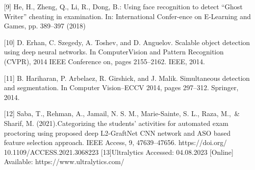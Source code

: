 \documentclass[conference]{IEEEtran}
\begin{document}
 [9]   He, H., Zheng, Q., Li, R., Dong, B.: Using face recognition to detect
    “Ghost Writer” cheating in examination. In: International Confer-ence on
    E-Learning and Games, pp. 389–397 (2018)

[10] D. Erhan, C. Szegedy, A. Toshev, and D. Anguelov. Scalable
     object detection using deep neural networks. In ComputerVision and Pattern Recognition (CVPR), 2014 IEEE Conference on, pages 2155–2162. IEEE, 2014.

[11] B. Hariharan, P. Arbelaez, R. Girshick, and J. Malik. Simultaneous               detection and segmentation. In Computer Vision–ECCV 2014, pages 297–312.         Springer, 2014.     

[12] Saba, T., Rehman, A., Jamail, N. S. M., Marie-Sainte, S. L., Raza, M.,\ &         Sharif, M. (2021).Categorizing the students’ activities for automated exam       proctoring using proposed deep L2-GraftNet CNN network and ASO based             feature selection approach. IEEE Access, 9, 47639–47656. https://doi.org/        10.1109/ACCESS.2021.3068223
[13]Ultralytics Accessed: 04.08.2023 [Online]
    Available: https://www.ultralytics.com/
\end{document}
